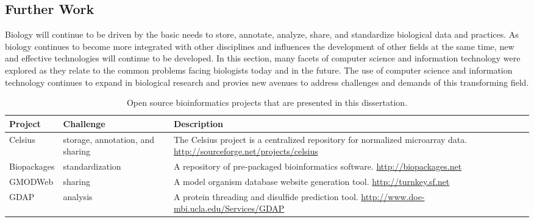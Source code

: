 \subsection{Further Work}

Biology will continue to be driven by the basic needs to store, annotate,
analyze, share, and standardize biological data and practices. As biology
continues to become more integrated with other disciplines and influences the
development of other fields at the same time, new and effective technologies
will continue to be developed. In this section, many facets of computer science
and information technology were explored as they relate to the common problems
facing biologists today and in the future.  The use of computer science and
information technology continues to expand in biological research and provies
new avenues to address challenges and demands of this transforming field.



\begin{table}[p]
\caption[Open source bioinformatics projects]{Open source bioinformatics projects that are presented in this dissertation.}
\label{projects}
\begin{tabular}{|l|p{3cm}|p{7cm}|}
\hline
\textbf{Project} & \textbf{Challenge} & \textbf{Description} \\
\hline
\hline
Celsius & storage, annotation, and sharing  & The Celsius project is a centralized repository for normalized microarray data. \url{http://sourceforge.net/projects/celsius} \\
Biopackages & standardization & A repository of pre-packaged bioinformatics software. \url{http://biopackages.net} \\
GMODWeb & sharing & A model organism database website generation tool. \url{http://turnkey.sf.net} \\
GDAP & analysis & A protein threading and disulfide prediction tool. \url{http://www.doe-mbi.ucla.edu/Services/GDAP}\\
\hline
\end{tabular}
\end{table}

\clearpage


